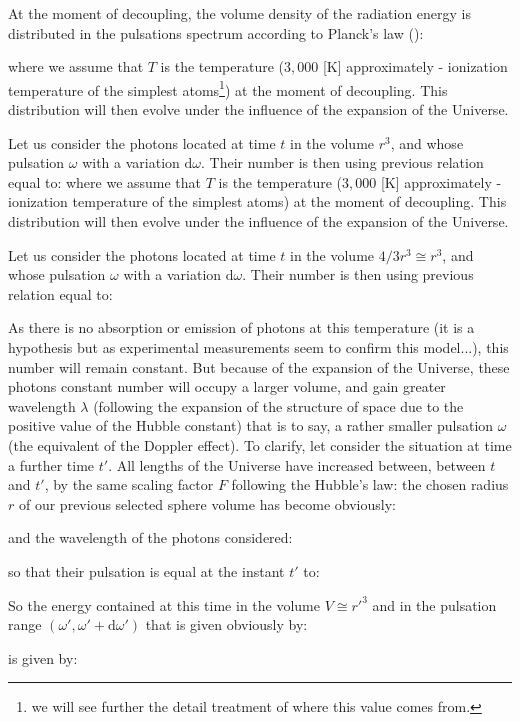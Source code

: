 	At the moment of decoupling, the volume density of the radiation energy is distributed in the pulsations spectrum according to Planck's law ():
	
	where we assume that $T$ is the temperature ($3,000$ [K] approximately - ionization temperature of the simplest atoms\footnote{we will see further the detail treatment of where this value comes from.}) at the moment of decoupling. This distribution will then evolve under the influence of the expansion of the Universe.

	Let us consider the photons located at time $t$ in the volume $r^3$, and whose pulsation $\omega$ with a variation $\mathrm{d}\omega$. Their number is then using previous relation equal to:
	where we assume that $T$ is the temperature ($3,000$ [K] approximately - ionization temperature of the simplest atoms) at the moment of decoupling. This distribution will then evolve under the influence of the expansion of the Universe.

	Let us consider the photons located at time $t$ in the volume $4/3r^3\cong r^3$, and whose pulsation $\omega$ with a variation $\mathrm{d}\omega$. Their number is then using previous relation equal to:
	
	As there is no absorption or emission of photons at this temperature (it is a hypothesis but as experimental measurements seem to confirm this model...), this number will remain constant. But because of the expansion of the Universe, these photons constant number will occupy a larger volume, and gain greater wavelength $\lambda$ (following the expansion of the structure of space due to the positive value of the Hubble constant) that is to say, a rather smaller pulsation $\omega$ (the equivalent of the Doppler effect). To clarify, let consider the situation at time a further time $t'$. All lengths of the Universe have increased between, between $t$ and $t'$, by the same scaling factor $F$ following the Hubble's law: the chosen radius $r$ of our previous selected sphere volume has become obviously:
	
	and the wavelength of the photons considered:
	
	so that their pulsation is equal at the instant $t'$ to:
	
	So the energy contained at this time in the volume $V\cong {r'}^3$ and in the pulsation range $(\omega',\omega'+\mathrm{d}\omega')$ that is given obviously by:
	
	is given by:
	
